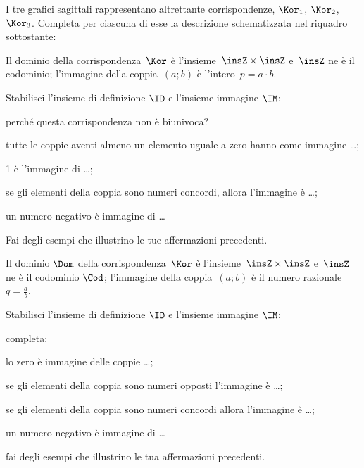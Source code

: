\begin{esercizio}
\label{ese:C.7}
I tre grafici sagittali rappresentano altrettante corrispondenze, $\Kor_1$, $\Kor_2$, $\Kor_3$.
Completa per ciascuna di esse la descrizione schematizzata nel riquadro sottostante:
\begin{center}
 
\end{center}
\end{esercizio}
\pagebreak
\begin{esercizio}
\label{ese:C.8}
Il dominio della corrispondenza~$\Kor$ è l'insieme~$\insZ\times\insZ$ e~$\insZ$ ne è il codominio; l'immagine della coppia~$(a;b)$ è l'intero~$p=a \cdot b$.
\begin{enumeratea}
\item Stabilisci l'insieme di definizione $\ID$ e l'insieme immagine $\IM$;
\item perché questa corrispondenza non è biunivoca?
\item tutte le coppie aventi almeno un elemento uguale a zero hanno come immagine \ldots;
\item 1 è l'immagine di \ldots;
\item se gli elementi della coppia sono numeri concordi, allora l'immagine è \ldots;
\item un numero negativo è immagine di \ldots
\end{enumeratea}
Fai degli esempi che illustrino le tue affermazioni precedenti.
\end{esercizio}

\begin{esercizio}
\label{ese:C.9}
Il dominio $\Dom$ della corrispondenza~$\Kor$ è l'insieme~$\insZ\times\insZ$ e~$\insZ$ ne è il codominio $\Cod$; l'immagine della coppia~$(a;b)$ è il numero razionale~$q=\frac{a}{b}$.
\begin{enumeratea}
\item Stabilisci l'insieme di definizione $\ID$ e l'insieme immagine $\IM$;
\item completa:
\begin{enumeratea}
\item lo zero è immagine delle coppie \ldots;
\item se gli elementi della coppia sono numeri opposti l'immagine è \ldots;
\item se gli elementi della coppia sono numeri concordi allora l'immagine è \ldots;
\item un numero negativo è immagine di \ldots
\end{enumeratea}
\item fai degli esempi che illustrino le tua affermazioni precedenti.
\end{enumeratea}
\end{esercizio}

